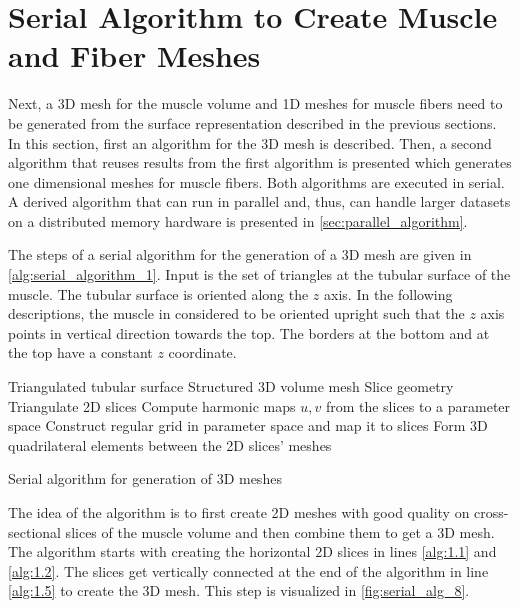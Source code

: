 \section{Serial Algorithm to Create Muscle and Fiber Meshes}\label{sec:ser_alg_meshes}
Next, a 3D mesh for the muscle volume and 1D meshes for muscle fibers need to be generated from the surface representation described in the previous sections. In this section, first an algorithm for the 3D mesh is described. Then, a second algorithm that reuses results from the first algorithm is presented which generates one dimensional meshes for muscle fibers. Both algorithms are executed in serial. A derived algorithm that can run in parallel and, thus, can handle larger datasets on a distributed memory hardware is presented in \cref{sec:parallel_algorithm}.

The steps of a serial algorithm for the generation of a 3D mesh are given in \cref{alg:serial_algorithm_1}. Input is the set of triangles at the tubular surface of the muscle. The tubular surface is oriented along the $z$ axis. In the following descriptions, the muscle in considered to be oriented upright such that the $z$ axis points in vertical direction towards the top. The borders at the bottom and at the top have a constant $z$ coordinate.
%
\begin{algorithm}
  \begin{algorithmic}[1]%
    \Require Triangulated tubular surface
    \Ensure Structured 3D volume mesh
    \Statex
    \State Slice geometry           \label{alg:1.1}
    \State Triangulate 2D slices      \label{alg:1.2}
    \State Compute harmonic maps $u, v$ from the slices to a parameter space     \label{alg:1.3}
    \State Construct regular grid in parameter space and map it to slices            \label{alg:1.4}
    \State Form 3D quadrilateral elements between the 2D slices’ meshes   \label{alg:1.5}
    \EndProcedure
  \end{algorithmic}%
  \caption{Serial algorithm for generation of 3D meshes}%
  \label{alg:serial_algorithm_1}%
\end{algorithm}%

The idea of the algorithm is to first create 2D meshes with good quality on cross-sectional slices of the muscle volume and then combine them to get a 3D mesh. The algorithm starts with creating the horizontal 2D slices in lines \ref{alg:1.1} and \ref{alg:1.2}. The slices get vertically connected at the end of the algorithm in line \ref{alg:1.5} to create the 3D mesh. This step is visualized in \cref{fig:serial_alg_8}. 

